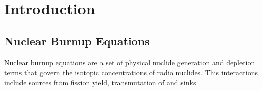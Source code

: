 \chapter{Introduction} \label{ch:introduction}

\section{Nuclear Burnup Equations}
Nuclear burnup equations are a set of physical nuclide generation and depletion terms that govern the isotopic concentrations of radio nuclides. This interactions include sources from fission yield, transmutation of  and sinks 
